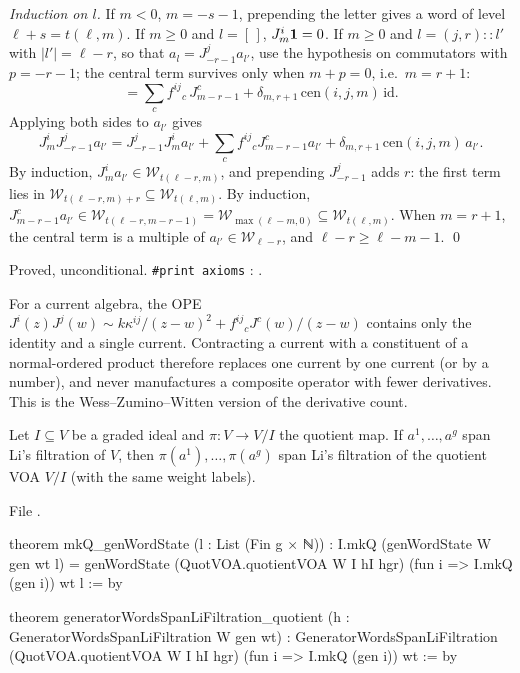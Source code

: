 \emph{Induction on $l$.} If $m<0$, $m = -s-1$, prepending the letter gives a word of level
$\ell+s = t(\ell,m)$. If $m\ge0$ and $l = [\,]$, $J^i_m\mathbf{1} = 0$. If $m\ge0$ and $l = (j,r)::l'$ with $|l'| = \ell-r$,
so that $a_l = J^j_{-r-1}a_{l'}$, use the hypothesis on commutators with $p=-r-1$; the central term survives only when
$m+p = 0$, i.e.\ $m = r+1$:
\begin{equation*}
  [J^i_m,J^j_{-r-1}] = \sum_cf^{ij}{}_c\,J^c_{m-r-1} + \delta_{m,r+1}\,\mathrm{cen}(i,j,m)\,\mathrm{id}.
\end{equation*}
Applying both sides to $a_{l'}$ gives
\begin{equation*}
  J^i_mJ^j_{-r-1}a_{l'} = J^j_{-r-1}J^i_ma_{l'} + \sum_cf^{ij}{}_cJ^c_{m-r-1}a_{l'} + \delta_{m,r+1}\,\mathrm{cen}(i,j,m)\,a_{l'} .
\end{equation*}
By induction, $J^i_ma_{l'}\in \mathcal W_{t(\ell-r,m)}$, and prepending $J^j_{-r-1}$ adds $r$: the first term lies in
$\mathcal W_{t(\ell-r,m)+r}\subseteq \mathcal W_{t(\ell,m)}$. By induction, $J^c_{m-r-1}a_{l'}\in \mathcal W_{t(\ell-r,m-r-1)} = \mathcal W_{\max(\ell-m,0)}\subseteq
\mathcal W_{t(\ell,m)}$. When $m = r+1$, the central term is a multiple of $a_{l'}\in \mathcal W_{\ell-r}$, and $\ell-r\ge\ell-m-1$. \qed

\begin{status}
Proved, unconditional. \texttt{\#print axioms}
\allowbreak{}\allowbreak{}\allowbreak{}\allowbreak{}: \lean{[propext, Classical.}\allowbreak{}\allowbreak\lean{sound]}.
\end{status}

\begin{physics}
For a current algebra, the OPE $J^i(z)J^j(w)\sim k\kappa^{ij}/(z-w)^2 + f^{ij}{}_cJ^c(w)/(z-w)$ contains only the identity and
a single current. Contracting a current with a constituent of a normal-ordered product therefore replaces one current
by one current (or by a number), and never manufactures a composite operator with fewer derivatives. This is the
Wess--Zumino--Witten version of the derivative count.
\end{physics}

\begin{theorem}\label{l11:thm:wordquot}
Let $I\subseteq V$ be a graded ideal and $\pi:V\to V/I$ the quotient map. If $a^1,\dots,a^g$ span Li's filtration of $V$, then
$\pi(a^1),\dots,\pi(a^g)$ span Li's filtration of the quotient VOA $V/I$ (with the same weight labels).
\end{theorem}
\noindent File .
\begin{leancode}
theorem mkQ_genWordState (l : List (Fin g × ℕ)) :
    I.mkQ (genWordState W gen wt l) =
      genWordState (QuotVOA.quotientVOA W I hI hgr) (fun i => I.mkQ (gen i)) wt l := by

theorem generatorWordsSpanLiFiltration_quotient (h : GeneratorWordsSpanLiFiltration W gen wt) :
    GeneratorWordsSpanLiFiltration (QuotVOA.quotientVOA W I hI hgr)
      (fun i => I.mkQ (gen i)) wt := by
\end{leancode}

